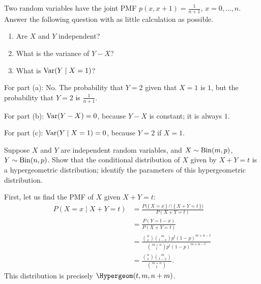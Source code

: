 \begin{problem}[Handout 15, \# 13]
  Two random variables have the joint PMF \(p(x,x+1)=\frac{1}{n+1}\),
  \(x=0,\dotsc,n\). Answer the following question with as little
  calculation as possible.
  \begin{enumerate}[label=(\alph*),noitemsep]
  \item Are \(X\) and \(Y\) independent?
  \item What is the variance of \(Y-X\)?
  \item What is \(\operatorname{Var}(Y\mid {X=1})\)?
  \end{enumerate}
\end{problem}
\begin{solution}
  For part (a): No. The probability that $Y=2$ given that $X=1$ is $1$, but
  the probability that $Y=2$ is $\frac{1}{n+1}$.

  For part (b): $\operatorname{Var}(Y-X) = 0$, because $Y-X$ is constant; it is
  always $1$.

  For part (c): $\operatorname{Var}(Y\mid X=1) = 0$, because $Y = 2$ if $X=1$.
\end{solution}

\begin{problem}
  Suppose \(X\) and \(Y\) are independent random variables, and
  \(X\sim\operatorname{Bin}(m,p)\), \(Y\sim\operatorname{Bin}(n,p)\). Show that the conditional
  distribution of \(X\) given by \(X+Y=t\) is a hypergeometric
  distribution; identify the parameters of this hypergeometric
  distribution.
\end{problem}
\begin{solution}
  First, let us find the PMF of \(X\) given \(X+Y=t\):
  \begin{align*}
    P(X=x\mid X+Y=t)
    &=\frac{P\bigl(\{\,X=x\,\}\cap\{\,X+Y=t\,\}\bigr)}{P(X+Y=t)}\\
    &=\frac{P(Y=t-x)}{P(X+Y=t)}\\
    &=\frac{\binom{n}{x}\binom{m}{t-x}p^t(1-p)^{m+n-t}}
      {\binom{m+n}{t}p^t(1-p)^{m+n-t}}\\
    &=\frac{\binom{n}{x}\binom{m}{t-x}}{\binom{m+n}{t}}.
  \end{align*}
  This distribution is precisely \(\Hypergeom(t,m,n+m)\).
\end{solution}

